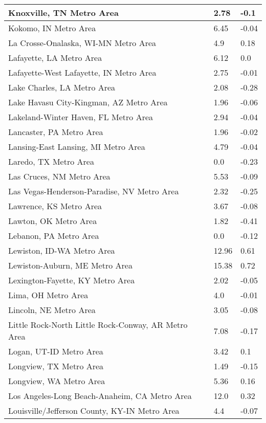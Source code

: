 \documentclass[12pt,oneside, letterpaper]{book}
\begin{document}
\begin{longtable}{| p{} | p{} | p{} |}
    Knoxville, TN Metro Area & 2.78 & -0.1 \\ \hline
    Kokomo, IN Metro Area & 6.45 & -0.04 \\ \hline
    La Crosse-Onalaska, WI-MN Metro Area & 4.9 & 0.18 \\ \hline
    Lafayette, LA Metro Area & 6.12 & 0.0 \\ \hline
    Lafayette-West Lafayette, IN Metro Area & 2.75 & -0.01 \\ \hline
    Lake Charles, LA Metro Area & 2.08 & -0.28 \\ \hline
    Lake Havasu City-Kingman, AZ Metro Area & 1.96 & -0.06 \\ \hline
    Lakeland-Winter Haven, FL Metro Area & 2.94 & -0.04 \\ \hline
    Lancaster, PA Metro Area & 1.96 & -0.02 \\ \hline
    Lansing-East Lansing, MI Metro Area & 4.79 & -0.04 \\ \hline
    Laredo, TX Metro Area & 0.0 & -0.23 \\ \hline
    Las Cruces, NM Metro Area & 5.53 & -0.09 \\ \hline
    Las Vegas-Henderson-Paradise, NV Metro Area & 2.32 & -0.25 \\ \hline
    Lawrence, KS Metro Area & 3.67 & -0.08 \\ \hline
    Lawton, OK Metro Area & 1.82 & -0.41 \\ \hline
    Lebanon, PA Metro Area & 0.0 & -0.12 \\ \hline
    Lewiston, ID-WA Metro Area & 12.96 & 0.61 \\ \hline
    Lewiston-Auburn, ME Metro Area & 15.38 & 0.72 \\ \hline
    Lexington-Fayette, KY Metro Area & 2.02 & -0.05 \\ \hline
    Lima, OH Metro Area & 4.0 & -0.01 \\ \hline
    Lincoln, NE Metro Area & 3.05 & -0.08 \\ \hline
    Little Rock-North Little Rock-Conway, AR Metro Area & 7.08 & -0.17 \\ \hline
    Logan, UT-ID Metro Area & 3.42 & 0.1 \\ \hline
    Longview, TX Metro Area & 1.49 & -0.15 \\ \hline
    Longview, WA Metro Area & 5.36 & 0.16 \\ \hline
    Los Angeles-Long Beach-Anaheim, CA Metro Area & 12.0 & 0.32 \\ \hline
    Louisville/Jefferson County, KY-IN Metro Area & 4.4 & -0.07 \\ \hline

\end{longtable}
\end{document}

